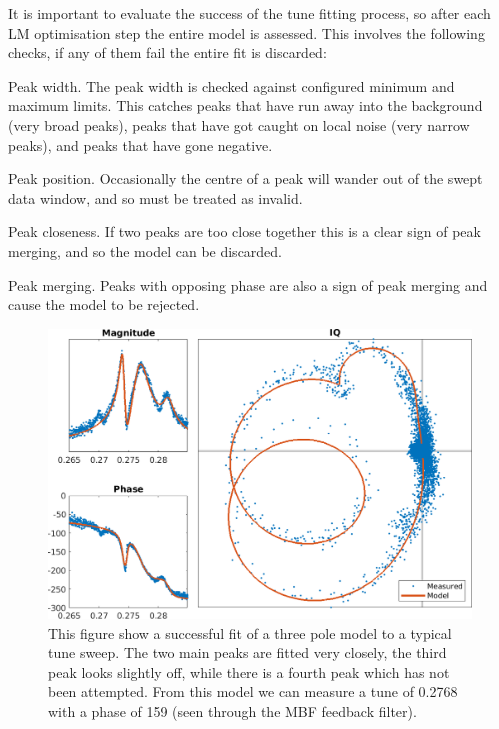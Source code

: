 \documentclass[
    a4paper,
    keeplastbox,            %
    hyphens,                %
    nospread,               %
    refpage,                %
]{jacow}
\newcommand{\squarecaption}[2][1]{\caption[#1]{#2\unskip\parfillskip 0pt}}
\begin{document}
It is important to evaluate the success of the tune fitting process, so after
each LM optimisation step the entire model is assessed.  This involves the
following checks, if any of them fail the entire fit is discarded:
\begin{Itemize}
\item Peak width.  The peak width is checked against configured minimum and
    maximum limits.  This catches peaks that have run away into the background
    (very broad peaks), peaks that have got caught on local noise (very narrow
    peaks), and peaks that have gone negative.
\item Peak position.  Occasionally the centre of a peak will wander out of the
    swept data window, and so must be treated as invalid.
\item Peak closeness.  If two peaks are too close together this is a clear sign
    of peak merging, and so the model can be discarded.
\item Peak merging.  Peaks with opposing phase are also a sign of peak merging
    and cause the model to be rejected.
\end{Itemize}



\begin{figure}[ht]
\includegraphics[width=\linewidth]{WECO03f5.png}
\squarecaption{%
This figure show a successful fit of a three pole model to a typical tune sweep.
The two main peaks are fitted very closely, the third peak looks slightly off,
while there is a fourth peak which has not been attempted.  From this model we
can measure a tune of 0.2768 with a phase of 159\textdegree{} (seen through the
MBF feedback filter).
}
\label{fig:full-fit}
\end{figure}
\end{document}
